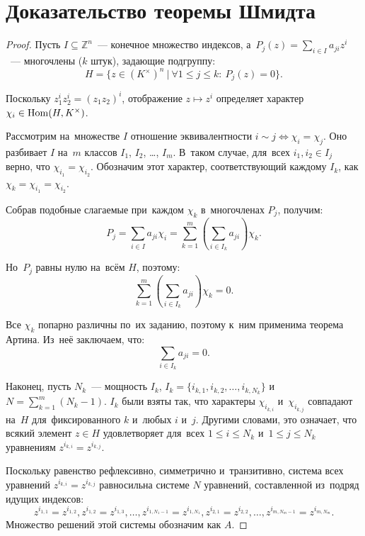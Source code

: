 \documentclass{article}
\begin{document}
\section{Доказательство теоремы Шмидта}

\begin{proof}
  Пусть $I \subseteq \mathbb{Z}^n$~— конечное множество индексов,
  а~$P_j(z) = \sum_{i \in I} a_{ji} z^i$~— многочлены ($k$ штук), задающие подгруппу:
  $$
      H = \{ z \in (K^{\times})^n\ |\ \forall 1 \leq j \leq k{:}\ P_j(z) = 0 \}.
  $$

  Поскольку $z_1^{i} z_2^{i} = (z_1 z_2)^i$, отображение $z \mapsto z^i$ определяет
  характер $\chi_i \in \mathrm{Hom}(H, K^{\times})$.

  Рассмотрим на~множестве $I$ отношение эквивалентности $i \sim j \Leftrightarrow \chi_i = \chi_j$.
  Оно разбивает $I$ на~$m$ классов $I_1$, $I_2$, …, $I_m$. В~таком случае, для~всех $i_1, i_2 \in I_j$ верно, что $\chi_{i_1} = \chi_{i_2}$.
  Обозначим этот характер, соответствующий каждому $I_k$, как $\chi_k = \chi_{i_1} = \chi_{i_2}$.

  Собрав подобные слагаемые при~каждом $\chi_k$ в~многочленах $P_j$, получим:
  $$
      P_j = \sum_{i \in I} a_{ji} \chi_i = \sum_{k = 1}^{m} \left( \sum_{i \in I_k} a_{ji} \right) \chi_k.
  $$

  Но~$P_j$ равны нулю на~всём $H$, поэтому:
  $$
  \sum_{k = 1}^{m} \left( \sum_{i \in I_k} a_{ji} \right) \chi_k = 0.
  $$

  Все $\chi_k$ попарно различны по~их заданию, поэтому к~ним применима теорема Артина. Из~неё заключаем, что:
  $$
  \sum_{i \in I_k} a_{ji} = 0.
  $$

  Наконец, пусть $N_k$~— мощность $I_k$, $I_k = \{i_{k, 1}, i_{k, 2}, \ldots, i_{k, N_k}\}$ и~$N = \sum_{k = 1}^m (N_k - 1)$.
  $I_k$ были взяты так, что характеры $\chi_{i_{k, i}}$ и~$\chi_{i_{k, j}}$ совпадают на~$H$ для~фиксированного $k$ и~любых $i$ и~$j$.
  Другими словами, это означает, что всякий элемент $z \in H$ удовлетворяет для~всех $1 \leq i \leq N_k$ и~$1 \leq j \leq N_k$
  уравнениям $z^{i_{k, i}} = z^{i_{k, j}}$.

  Поскольку равенство рефлексивно, симметрично и~транзитивно, система всех уравнений $z^{i_{k, i}} = z^{i_{k, j}}$ равносильна
  системе $N$ уравнений, составленной из~подряд идущих индексов:
  $$
      z^{i_{1, 1}} = z^{i_{1, 2}}, z^{i_{1, 2}} = z^{i_{1, 3}}, \ldots, z^{i_{1, N_1 - 1}} = z^{i_{1, N_1}}, z^{i_{2, 1}} = z^{i_{2, 2}}, \ldots, z^{i_{m, N_m - 1}} = z^{i_{m, N_m}}.
  $$
  Множество решений этой системы обозначим как $A$.


\end{proof}
\end{document}
